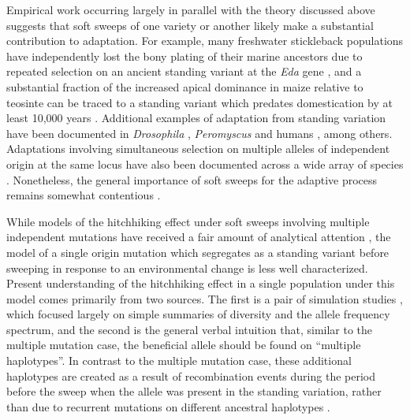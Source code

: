 \documentclass[a4paper,10pt]{article}
\begin{document}
Empirical work occurring largely in parallel with the theory discussed above suggests that soft sweeps of one variety or another likely make a substantial contribution to adaptation. For example, many freshwater stickleback populations have independently lost the bony plating of their marine ancestors due to repeated selection on an ancient standing variant at the \textit{Eda} gene \citep{Colosimo:2005ee}, and a substantial fraction of the increased apical dominance in maize relative to teosinte can be traced to a standing variant which predates domestication by at least 10,000 years \citep{Studer:2011bya}. Additional examples of adaptation from standing variation have been documented in \textit{Drosophila} \citep{Magwire:2011eq}, \textit{Peromyscus} \citep{Domingues:2012kw} and humans \citep{Peter:2012ht}, among others. Adaptations involving simultaneous selection on multiple alleles of independent origin at the same locus have also been documented across a wide array of species \citep{Menozzi:2004iu,Nair2007,Karasov:2010ij,Salgueiro:2010hx,Schmidt:2010bu,Jones:2013iw}. Nonetheless, the general importance of soft sweeps for the adaptive process remains somewhat contentious \citep[see e.g.][]{Jensen:2014hd}.

While models of the hitchhiking effect under soft sweeps involving multiple independent mutations have received a fair amount of analytical attention \citep{Pennings2006a,Pennings2006,Hermisson2008,Pokalyuk2012,Wilson:2014ke}, the model of a single origin mutation which segregates as a standing variant before sweeping in response to an environmental change is less well characterized. Present understanding of the hitchhiking effect in a single population under this model comes primarily from two sources. The first is a pair of simulation studies \citep{Innan:2004bk,Przeworski2005}, which focused largely on simple summaries of diversity and the allele frequency spectrum, and the second is the general verbal intuition that, similar to the multiple mutation case, the beneficial allele should be found on ``multiple haplotypes''. In contrast to the multiple mutation case, these additional haplotypes are created as a result of recombination events during the period before the sweep when the allele was present in the standing variation, rather than due to recurrent mutations on different ancestral haplotypes \citep{BARRETT:2008cs,Messer:2013kh}.
\end{document}
